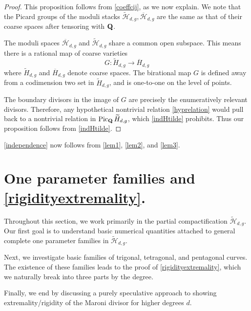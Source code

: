 \documentclass[reqno, 10 pt]{article}
\theoremstyle{definition}
\theoremstyle{remark}
\numberwithin{equation}{section}
\numberwithin{thm}{section}
\numberwithin{prop}{section}
\numberwithin{lem}{section}
\numberwithin{cor}{section}
\numberwithin{conj}{section}
\numberwithin{defn}{section}
\renewcommand{\H}{\mathcal H}
\newcommand{\td}{\widetilde}
\newcommand{\Hdg}{\overline{\H}_{d,g}}
\renewcommand{\to}{\longrightarrow}
\newcommand {\Q}{{\bf Q}}
\newcommand {\from}{{\colon}}
\newcommand{\tw}[1]{\widetilde{#1}}
\renewcommand{\H}{{\mathcal{H}}}
\begin{document}
    \begin{proof}
    This proposition follows from \autoref{coeffcij}, as we now explain. We note that the Picard groups of the moduli stacks $\tw{\H}_{d,g}, \Hdg$ are the same as that of their coarse spaces after tensoring with $\Q$.

     The moduli spaces $\Hdg$ and $\tw{\H}_{d,g}$ share a common open subspace.  This means there is a rational map of coarse varieties $$G \from \tw{H}_{d,g} \to \overline{H}_{d,g}$$
    where $\tw{H}_{d,g}$ and $\overline{H}_{d,g}$ denote coarse spaces. The birational map $G$ is defined away from a codimension two set in $\tw{H}_{d,g}$, and is one-to-one on the level of points. 

    The boundary divisors in the image of $G$ are precisely the enumeratively relevant divisors.  Therefore, any hypothetical nontrivial relation \ref{hyprelation} would pull back to a nontrivial relation in ${\rm Pic}_{\Q}\,\tw{H}_{d,g}$, which \autoref{indHtilde} prohibits.  Thus our proposition follows from \autoref{indHtilde}.
    \end{proof}

    \theoremstyle{remark}



    \autoref{independence} now follows from \autoref{lem1},  \autoref{lem2}, and  \autoref{lem3}.



\section{One parameter families and \autoref{rigidityextremality}.} \label{ThirdSection}

Throughout this section, we work primarily in the partial compactification $\td \H_{d,g}$.  Our first goal is to understand basic numerical quantities attached to general complete one parameter families in $\td \H_{d,g}$.

Next, we investigate basic families of trigonal, tetragonal, and pentagonal curves. The existence of these families leads to the proof of \autoref{rigidityextremality}, which we naturally break into three parts by the degree. 

Finally, we end by discussing a purely speculative approach to showing extremality/rigidity of the Maroni divisor for higher degrees $d$. 

\subsection{}
\end{document}
